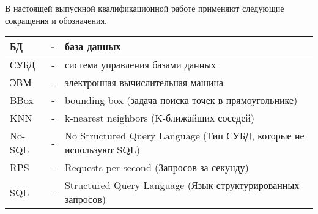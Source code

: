 \Abbreviations %
В настоящей выпускной квалификационной работе применяют следующие
сокращения и обозначения.

\vspace{1em}

\begin{longtable}{|m{3cm}|c|m{11cm}|}
\hline
БД & - & база данных \\
\hline
СУБД & - & система управления базами данных \\
\hline
ЭВМ & - & электронная вычислительная машина \\
\hline
BBox & - & bounding box (задача поиска точек в прямоугольнике) \\
\hline
KNN & - & k-nearest neighbors (K-ближайших соседей) \\
\hline
No-SQL & - & No Structured Query Language (Тип СУБД, которые не используют SQL) \\
\hline
RPS & - & Requests per second (Запросов за секунду) \\
\hline
SQL & - & Structured Query Language (Язык структурированных запросов) \\
\hline
\end{longtable}


